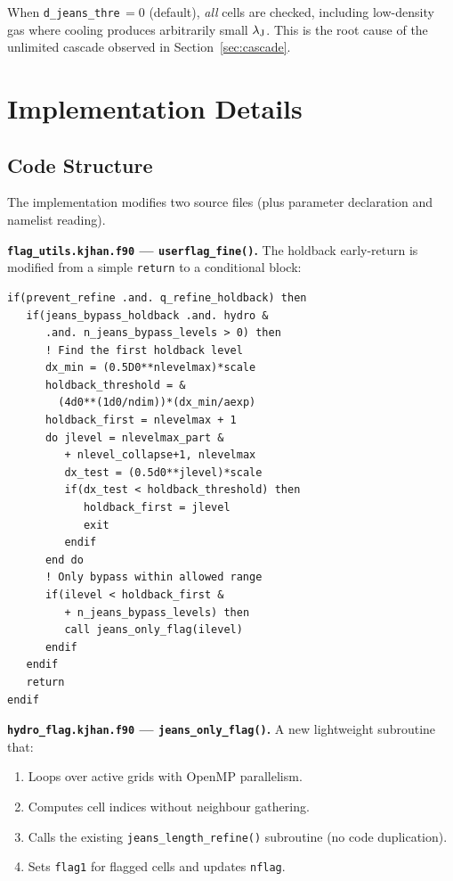 \documentclass[fleqn,usenatbib]{mnras}
\newcommand{\lJ}{\lambda_{\rm J}}
\newcommand{\code}[1]{\texttt{#1}}
\begin{document}
When \code{d\_jeans\_thre}$\,=0$ (default), \emph{all} cells are
checked, including low-density gas where cooling produces arbitrarily
small $\lJ$.  This is the root cause of the unlimited cascade observed
in Section~\ref{sec:cascade}.


\section{Implementation Details}
\label{sec:implementation}

\subsection{Code Structure}

The implementation modifies two source files (plus parameter declaration
and namelist reading).

\textbf{\code{flag\_utils.kjhan.f90} --- \code{userflag\_fine()}.}
The holdback early-return is modified from a simple \code{return} to a
conditional block:

\begin{lstlisting}
if(prevent_refine .and. q_refine_holdback) then
   if(jeans_bypass_holdback .and. hydro &
      .and. n_jeans_bypass_levels > 0) then
      ! Find the first holdback level
      dx_min = (0.5D0**nlevelmax)*scale
      holdback_threshold = &
        (4d0**(1d0/ndim))*(dx_min/aexp)
      holdback_first = nlevelmax + 1
      do jlevel = nlevelmax_part &
         + nlevel_collapse+1, nlevelmax
         dx_test = (0.5d0**jlevel)*scale
         if(dx_test < holdback_threshold) then
            holdback_first = jlevel
            exit
         endif
      end do
      ! Only bypass within allowed range
      if(ilevel < holdback_first &
         + n_jeans_bypass_levels) then
         call jeans_only_flag(ilevel)
      endif
   endif
   return
endif
\end{lstlisting}

\textbf{\code{hydro\_flag.kjhan.f90} --- \code{jeans\_only\_flag()}.}
A new lightweight subroutine that:
\begin{enumerate}
  \item Loops over active grids with OpenMP parallelism.
  \item Computes cell indices without neighbour gathering.
  \item Calls the existing \code{jeans\_length\_refine()} subroutine
    (no code duplication).
  \item Sets \code{flag1} for flagged cells and updates \code{nflag}.
\end{enumerate}
\end{document}
